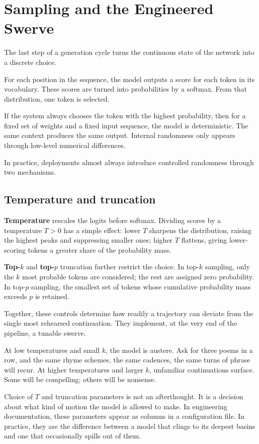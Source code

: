 \documentclass[12pt,a4paper]{article}
\begin{document}
\section{Sampling and the Engineered Swerve}

The last step of a generation cycle turns the continuous state of the network into a discrete choice.

For each position in the sequence, the model outputs a score for each token in its vocabulary. These scores are turned into probabilities by a softmax. From that distribution, one token is selected.

If the system always chooses the token with the highest probability, then for a fixed set of weights and a fixed input sequence, the model is deterministic. The same context produces the same output. Internal randomness only appears through low-level numerical differences.

In practice, deployments almost always introduce controlled randomness through two mechanisms.

\subsection*{Temperature and truncation}

\textbf{Temperature} rescales the logits before softmax. Dividing scores by a temperature $T>0$ has a simple effect: lower $T$ sharpens the distribution, raising the highest peaks and suppressing smaller ones; higher $T$ flattens, giving lower-scoring tokens a greater share of the probability mass.

\textbf{Top-$k$} and \textbf{top-$p$} truncation further restrict the choice. In top-$k$ sampling, only the $k$ most probable tokens are considered; the rest are assigned zero probability. In top-$p$ sampling, the smallest set of tokens whose cumulative probability mass exceeds $p$ is retained.

Together, these controls determine how readily a trajectory can deviate from the single most rehearsed continuation. They implement, at the very end of the pipeline, a tunable swerve.

At low temperatures and small $k$, the model is austere. Ask for three poems in a row, and the same rhyme schemes, the same cadences, the same turns of phrase will recur. At higher temperatures and larger $k$, unfamiliar continuations surface. Some will be compelling; others will be nonsense.

Choice of $T$ and truncation parameters is not an afterthought. It is a decision about what kind of motion the model is allowed to make. In engineering documentation, these parameters appear as columns in a configuration file. In practice, they are the difference between a model that clings to its deepest basins and one that occasionally spills out of them.
\end{document}
